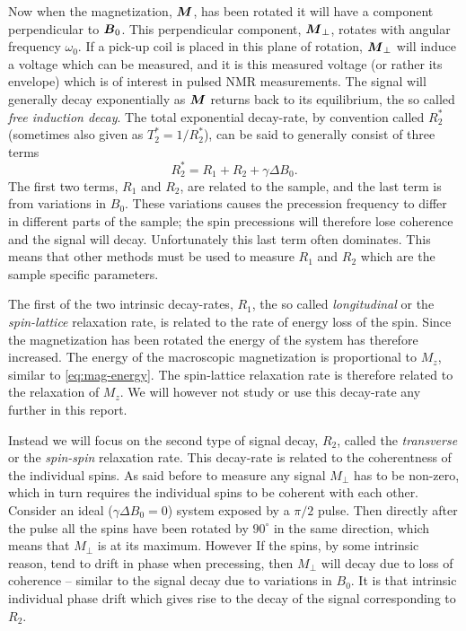 \documentclass[11pt,a4paper, twocolumn,
swedish, english %
]{article}
\begin{document}
Now when the magnetization, $\vb*M$, has been rotated it will have a
component perpendicular to $\vb*B_0$. This perpendicular component,
$\vb*M_\perp$, rotates with angular frequency $\omega_0$. If a pick-up
coil is placed in this plane of rotation, $\vb*M_\perp$ will induce a
voltage which can be measured, and it is this measured voltage (or
rather its envelope) which is of interest in pulsed NMR
measurements. The signal will generally decay exponentially as
$\vb*M$ returns back to its equilibrium, the so called 
\emph{free induction decay}. The total exponential decay-rate, by
convention called $R_2^*$ (sometimes also given as $T_2^*=1/R_2^*$),
can be said to generally consist of three terms 
\begin{equation}
R_2^*= R_1 + R_2 + \gamma\Delta B_0.
\end{equation}
The first two terms, $R_1$ and $R_2$, are related to the sample, and
the last term is from variations in $B_0$. These variations causes the
precession frequency to differ in different parts of the sample; the
spin precessions will therefore lose coherence and the signal will
decay. Unfortunately this last term often dominates. This means that
other methods must be used to measure $R_1$ and $R_2$ which are the
sample specific parameters. 

The first of the two intrinsic decay-rates, $R_1$, the so called
\emph{longitudinal} or the \emph{spin-lattice} relaxation rate, is
related to the rate of energy loss of the spin. Since the
magnetization has been rotated the energy of the system has therefore
increased. The energy of the macroscopic magnetization is proportional
to $M_z$, similar to \eqref{eq:mag-energy}. The spin-lattice
relaxation rate is therefore related to the relaxation of $M_z$. We
will however not study or use this decay-rate any further in this
report. 

Instead we will focus on the second type of signal decay, $R_2$,
called the \emph{transverse} or the \emph{spin-spin} relaxation
rate. This decay-rate is related to the coherentness of the individual
spins. As said before to measure any signal $M_\perp$ has to be
non-zero, which in turn requires the individual spins to be coherent
with each other. Consider an ideal ($\gamma\Delta B_0=0$) system
exposed by a $\pi/2$ pulse. Then directly after the pulse all the
spins have been rotated by $90^\circ$ in the same direction, which
means that $M_\perp$ is at its maximum. However If the spins, by some
intrinsic reason, tend to drift in phase when precessing, then
$M_\perp$ will decay due to loss of coherence -- similar to the signal
decay due to variations in $B_0$. It is that intrinsic individual
phase drift which gives rise to the decay of the signal corresponding
to $R_2$.  
\end{document}
